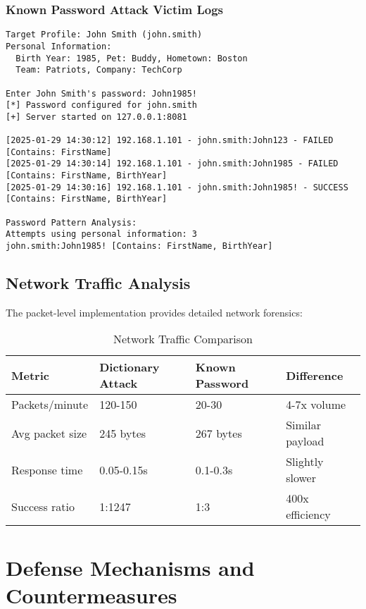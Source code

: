 \documentclass[12pt,a4paper]{article}
\begin{document}
\subsubsection{Known Password Attack Victim Logs}
\begin{lstlisting}[caption=Known Password Victim Server Logs]
Target Profile: John Smith (john.smith)
Personal Information:
  Birth Year: 1985, Pet: Buddy, Hometown: Boston
  Team: Patriots, Company: TechCorp
  
Enter John Smith's password: John1985!
[*] Password configured for john.smith
[+] Server started on 127.0.0.1:8081

[2025-01-29 14:30:12] 192.168.1.101 - john.smith:John123 - FAILED [Contains: FirstName]
[2025-01-29 14:30:14] 192.168.1.101 - john.smith:John1985 - FAILED [Contains: FirstName, BirthYear]
[2025-01-29 14:30:16] 192.168.1.101 - john.smith:John1985! - SUCCESS [Contains: FirstName, BirthYear]

Password Pattern Analysis:
Attempts using personal information: 3
john.smith:John1985! [Contains: FirstName, BirthYear]
\end{lstlisting}

\subsection{Network Traffic Analysis}

The packet-level implementation provides detailed network forensics:

\begin{table}[H]
\centering
\begin{tabular}{|l|l|l|l|}
\hline
\textbf{Metric} & \textbf{Dictionary Attack} & \textbf{Known Password} & \textbf{Difference} \\
\hline
Packets/minute & 120-150 & 20-30 & 4-7x volume \\
Avg packet size & 245 bytes & 267 bytes & Similar payload \\
Response time & 0.05-0.15s & 0.1-0.3s & Slightly slower \\
Success ratio & 1:1247 & 1:3 & 400x efficiency \\
\hline
\end{tabular}
\caption{Network Traffic Comparison}
\end{table}

\section{Defense Mechanisms and Countermeasures}
\end{document}
